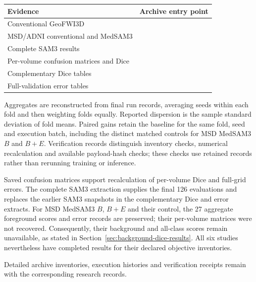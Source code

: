 \documentclass[12pt,a4paper]{article}
\begin{document}
\begin{center}
\small{}
\renewcommand{\arraystretch}{1.2}
\begin{tabular}{@{}P{3.8cm}P{11.2cm}@{}}
\hline
Evidence & Archive entry point \\
\hline
Conventional GeoFWI3D &  \\
MSD/ADNI conventional and MedSAM3 &  \\
Complete SAM3 results &  \\
Per-volume confusion matrices and Dice &  \\
Complementary Dice tables &  \\
Full-validation error tables &  \\
\hline
\end{tabular}
\end{center}

Aggregates are reconstructed from final run records, averaging seeds
within each fold and then weighting folds equally. Reported dispersion
is the sample standard deviation of fold means. Paired gains retain the
baseline for the same fold, seed and execution batch, including the
distinct matched controls for MSD MedSAM3 $B$ and $B+E$. Verification
records distinguish inventory checks, numerical recalculation and
available payload-hash checks; these checks use retained records rather
than rerunning training or inference.

Saved confusion matrices support recalculation of per-volume Dice and
full-grid errors. The complete SAM3 extraction supplies the final 126
evaluations and replaces the earlier SAM3 snapshots in the complementary
Dice and error extracts. For MSD MedSAM3 $B$, $B+E$ and their control,
the 27 aggregate foreground scores and error records are preserved;
their per-volume matrices were not recovered. Consequently, their
background and all-class scores remain unavailable, as stated in
Section~\ref{sec:background-dice-results}. All six studies nevertheless
have completed results for their declared objective inventories.

Detailed archive inventories, execution histories and verification
receipts remain with the corresponding research records.

\clearpage
\end{document}
